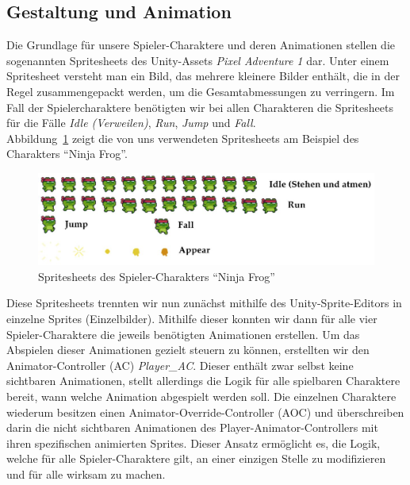 \subsection{Gestaltung und Animation}
\label{section: gestaltung_animation}

Die Grundlage für unsere Spieler-Charaktere und deren Animationen stellen die sogenannten Spritesheets des Unity-Assets \textit{Pixel Adventure 1} dar. Unter einem Spritesheet versteht man ein Bild, das mehrere kleinere Bilder enthält, die in der Regel zusammengepackt werden, um die Gesamtabmessungen zu verringern. Im Fall der Spielercharaktere benötigten wir bei allen Charakteren die  Spritesheets für die Fälle \textit{Idle (Verweilen)}, \textit{Run}, \textit{Jump} und \textit{Fall}.\\

Abbildung~\ref{fig:spritesheets_ninja} zeigt die von uns verwendeten Spritesheets am Beispiel des Charakters \enquote{Ninja Frog}.\\

\begin{figure}[th]
\centering
\includegraphics[width=150mm]{Figures/spritesheets_ninja.jpg}
\decoRule
\caption[Spritesheets des Spieler-Charakters \enquote{Ninja Frog}]{Spritesheets des Spieler-Charakters \enquote{Ninja Frog}}
\label{fig:spritesheets_ninja}
\end{figure}

Diese Spritesheets trennten wir nun zunächst mithilfe des Unity-Sprite-Editors in einzelne Sprites (Einzelbilder). Mithilfe dieser konnten wir dann für alle vier Spieler-Charaktere die jeweils benötigten Animationen erstellen. Um das Abspielen dieser Animationen gezielt steuern zu können, erstellten wir den Animator-Controller (AC) \textit{Player\_AC}. Dieser enthält zwar selbst keine sichtbaren Animationen, stellt allerdings die Logik für alle spielbaren Charaktere bereit, wann welche Animation abgespielt werden soll. Die einzelnen Charaktere wiederum besitzen einen Animator-Override-Controller (AOC) und überschreiben darin die nicht sichtbaren Animationen des Player-Animator-Controllers mit ihren spezifischen animierten Sprites. Dieser Ansatz ermöglicht es, die Logik, welche für alle Spieler-Charaktere gilt, an einer einzigen Stelle zu modifizieren und für alle wirksam zu machen.\\

